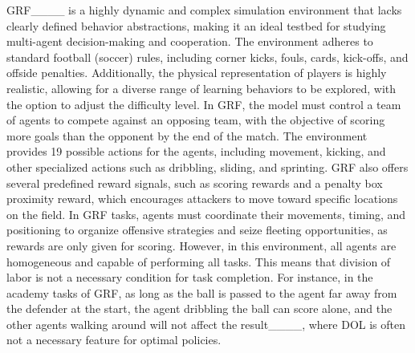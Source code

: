 GRF____ is a highly dynamic and complex simulation environment that lacks clearly defined behavior abstractions, making it an ideal testbed for studying multi-agent decision-making and cooperation.
The environment adheres to standard football (soccer) rules, including corner kicks, fouls, cards, kick-offs, and offside penalties.
Additionally, the physical representation of players is highly realistic, allowing for a diverse range of learning behaviors to be explored, with the option to adjust the difficulty level.
In GRF, the model must control a team of agents to compete against an opposing team, with the objective of scoring more goals than the opponent by the end of the match.
The environment provides 19 possible actions for the agents, including movement, kicking, and other specialized actions such as dribbling, sliding, and sprinting.
GRF also offers several predefined reward signals, such as scoring rewards and a penalty box proximity reward, which encourages attackers to move toward specific locations on the field.
In GRF tasks, agents must coordinate their movements, timing, and positioning to organize offensive strategies and seize fleeting opportunities, as rewards are only given for scoring.
However, in this environment, all agents are homogeneous and capable of performing all tasks.
This means that division of labor is not a necessary condition for task completion.
For instance, in the academy tasks of GRF, as long as the ball is passed to the agent far away from the defender at the start, the agent dribbling the ball can score alone, and the other agents walking around will not affect the result____, where DOL is often not a necessary feature for optimal policies.